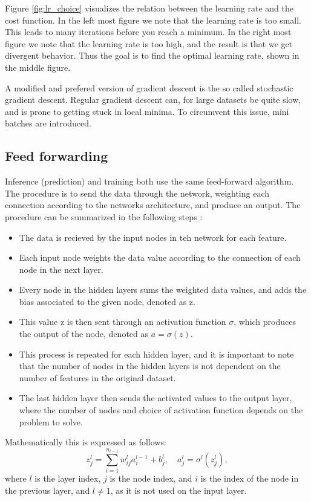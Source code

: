 Figure \ref{fig:lr_choice} visualizes the relation between the learning rate and the cost function. In the left most figure we note that the learning rate is too small. 
This leads to many iterations before you reach a minimum. In the right most figure we note that the learning rate is too high, and the result is that we get divergent behavior. 
Thus the goal is to find the optimal learning rate, shown in the middle figure. \par 
A modified and prefered version of gradient descent is the so called stochastic gradient descent. Regular gradient descent can, for large datasets be quite slow, and is prone to 
getting stuck in local minima. To circumvent this issue, mini batches are introduced. 




\subsection*{Feed forwarding}
Inference (prediction) and training both use the same feed-forward algorithm. The procedure is to send the data through the network, weighting each connection according to the networks architecture,
and produce an output. The procedure can be summarized in the following steps \cite{FYSSTK}:
 \begin{itemize}
    \item The data is recieved by the input nodes in teh network for each feature.
    \item Each input node weights the data value according to the connection of each node in the next layer.
    \item Every node in the hidden layers sums the weighted data values, and adds the bias associated to the given node, denoted as z. 
    \item This value z is then sent through an activation function $\sigma$, which produces the output of the node, denoted as $a = \sigma(z)$.
    \item This process is repeated for each hidden layer, and it is important to note that the number of nodes in the hidden layers is not dependent on the number of features in the original dataset. 
    \item The last hidden layer then sends the activated values to the output layer, where the number of nodes and choice of activation function depends on the problem to solve.
 \end{itemize}

Mathematically this is expressed as follows:
\begin{equation}
    z_j^l = \sum_{i=1}^{n_{l-1}} w_{ij}^l a_i^{l-1} + b_j^l, \quad a_j^l = \sigma^l(z_j^l),
\end{equation}
where $l$ is the layer index, $j$ is the node index, and $i$ is the index of the node in the previous layer, and $l \neq 1$, as it is not used on the input layer.


